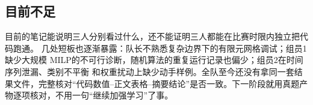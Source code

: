\subsection{目前不足}

目前的笔记能说明三人分别看过什么，还不能证明三人都能在比赛时限内独立把代码跑通。
几处短板也逐渐暴露：队长不熟悉复杂边界下的有限元网格调试；组员1缺少大规模
MILP的不可行诊断，随机算法的重复运行记录也偏少；组员2在时间序列泄漏、类别不平衡
和权重扰动上缺少动手样例。全队至今还没有拿同一套结果文件，完整核对“代码数值--正文表格--摘要结论”是否一致。下一阶段就用真题产物逐项核对，不用一句“继续加强学习”了事。

